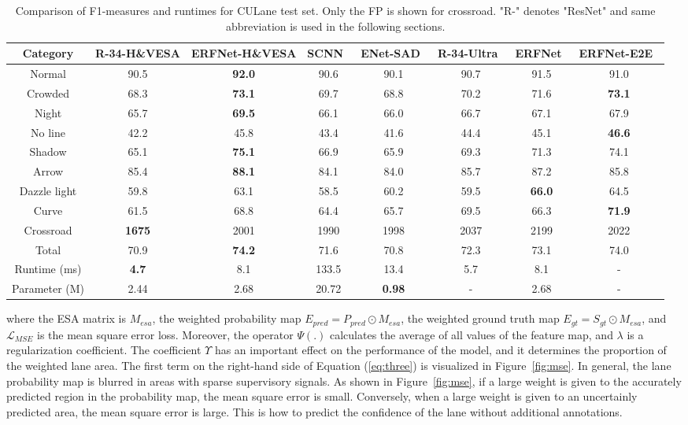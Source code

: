 \documentclass[10pt,twocolumn,letterpaper]{article}
\begin{document}
\begin{table*}[t]
	\label{culane_table}
	\centering
	\footnotesize{
		\begin{tabular}{c|c|c||c|c|c|c|c}
			\hline
			Category & \textbf{R-34-H\&VESA} & \textbf{ERFNet-H\&VESA} & SCNN~\cite{pan2017spatial} & ENet-SAD~\cite{hou2019learning} & R-34-Ultra~\cite{qin2020ultra} & ERFNet~\cite{romera2017erfnet} & ERFNet-E2E~\cite{yoo2020end} \\
			\hline \hline
			Normal & 90.5 & \textbf{92.0} & 90.6 & 90.1 & 90.7 & 91.5 & 91.0 \\
Crowded & 68.3 & \textbf{73.1} & 69.7 & 68.8 & 70.2 & 71.6 & \textbf{73.1} \\
Night & 65.7 & \textbf{69.5} & 66.1 & 66.0 & 66.7 & 67.1 & 67.9 \\
No line & 42.2 & 45.8 & 43.4 & 41.6 & 44.4 & 45.1 & \textbf{46.6} \\
Shadow & 65.1 & \textbf{75.1} & 66.9 & 65.9 & 69.3 & 71.3 & 74.1 \\
Arrow & 85.4 & \textbf{88.1} & 84.1 & 84.0 & 85.7 & 87.2 & 85.8 \\
Dazzle light & 59.8 & 63.1 & 58.5 & 60.2 & 59.5 & \textbf{66.0} & 64.5 \\
Curve & 61.5 & 68.8 & 64.4 & 65.7 & 69.5 & 66.3 & \textbf{71.9} \\
Crossroad & \textbf{1675} & 2001 & 1990 & 1998 & 2037 & 2199 & 2022 \\
Total & 70.9 & \textbf{74.2} & 71.6 & 70.8 & 72.3 & 73.1 & 74.0 \\
			\hline \hline
			Runtime (ms) &  \textbf{4.7} & 8.1 & 133.5 & 13.4 & 5.7 & 8.1 & \--  \\
			Parameter (M) & 2.44 & 2.68 & 20.72 & \textbf{0.98} & \-- & 2.68 & \--  \\
			\hline
		\end{tabular}
	}
	\caption{Comparison of F1-measures and runtimes for CULane test set. Only the FP is shown for crossroad. "R-" denotes "ResNet" and same abbreviation is used in the following sections.}
	\label{table:one}
	\vspace{-2ex}
\end{table*}

\noindent
where the ESA matrix is $M_{esa}$, the weighted probability map $E_{pred}=P_{pred}\odot M_{esa}$, the weighted ground truth map $E_{gt}=S_{gt}\odot M_{esa}$, and $\mathcal{L}_{MSE}$ is the mean square error loss. Moreover, the operator $\Psi(.)$ calculates the average of all values of the feature map, and $\lambda$ is a regularization coefficient. The coefficient $\Upsilon$ has an important effect on the performance of the model, and it determines the proportion of the weighted lane area. The first term on the right-hand side of Equation (\ref{eq:three}) is visualized in Figure~\ref{fig:mse}. In general, the lane probability map is blurred in areas with sparse supervisory signals. As shown in Figure~\ref{fig:mse}, if a large weight is given to the accurately predicted region in the probability map, the mean square error is small. Conversely, when a large weight is given to an uncertainly predicted area, the mean square error is large. This is how to predict the confidence of the lane without additional annotations.
\end{document}
